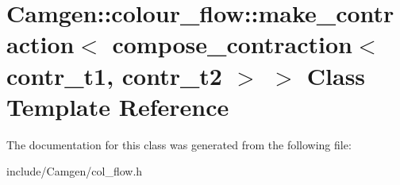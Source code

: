 \hypertarget{a00343}{}\section{Camgen\+:\+:colour\+\_\+flow\+:\+:make\+\_\+contraction$<$ compose\+\_\+contraction$<$ contr\+\_\+t1, contr\+\_\+t2 $>$ $>$ Class Template Reference}
\label{a00343}


The documentation for this class was generated from the following file\+:\begin{DoxyCompactItemize}
\item 
include/\+Camgen/col\+\_\+flow.\+h\end{DoxyCompactItemize}
